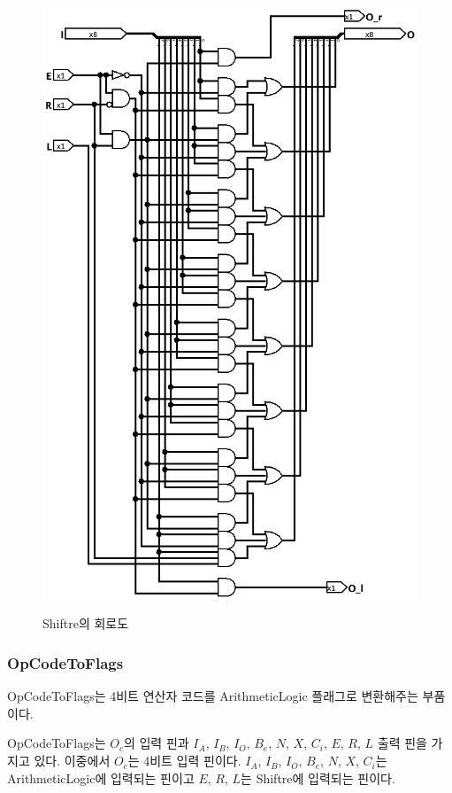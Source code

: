 \documentclass{article}
\begin{document}
\begin{figure}[p]
    \centering
    \includegraphics[scale=0.5]{Shiftre} \\
    \caption{Shiftre의 회로도}
    \label{fig:shr}
\end{figure}

\pagebreak

\subsubsection{OpCodeToFlags}

OpCodeToFlags는 4비트 연산자 코드를 ArithmeticLogic 플래그로 변환해주는
부품이다.

OpCodeToFlags는 $O_c$의 입력 핀과
$I_A$, $I_B$, $I_O$, $B_e$, $N$, $X$, $C_i$, $E$, $R$, $L$ 출력 핀을 가지고 있다.
이중에서 $O_c$는 4비트 입력 핀이다.
$I_A$, $I_B$, $I_O$, $B_e$, $N$, $X$, $C_i$는 ArithmeticLogic에 입력되는 핀이고
$E$, $R$, $L$는 Shiftre에 입력되는 핀이다.
\end{document}
